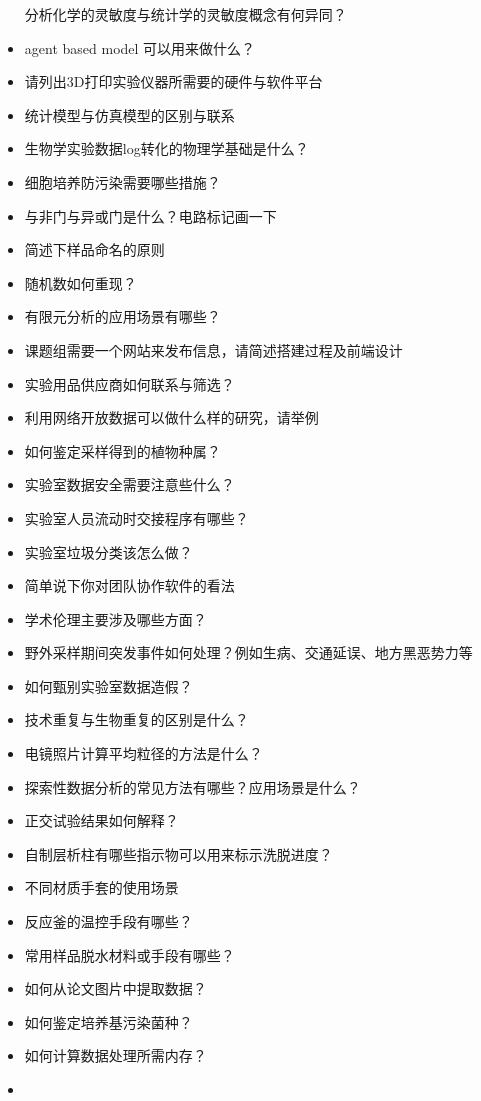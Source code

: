 \documentclass[]{tufte-book}
\begin{document}
\begin{itemize}
  分析化学的灵敏度与统计学的灵敏度概念有何异同？
\item
  agent based model 可以用来做什么？
\item
  请列出3D打印实验仪器所需要的硬件与软件平台
\item
  统计模型与仿真模型的区别与联系
\item
  生物学实验数据log转化的物理学基础是什么？
\item
  细胞培养防污染需要哪些措施？
\item
  与非门与异或门是什么？电路标记画一下
\item
  简述下样品命名的原则
\item
  随机数如何重现？
\item
  有限元分析的应用场景有哪些？
\item
  课题组需要一个网站来发布信息，请简述搭建过程及前端设计
\item
  实验用品供应商如何联系与筛选？
\item
  利用网络开放数据可以做什么样的研究，请举例
\item
  如何鉴定采样得到的植物种属？
\item
  实验室数据安全需要注意些什么？
\item
  实验室人员流动时交接程序有哪些？
\item
  实验室垃圾分类该怎么做？
\item
  简单说下你对团队协作软件的看法
\item
  学术伦理主要涉及哪些方面？
\item
  野外采样期间突发事件如何处理？例如生病、交通延误、地方黑恶势力等
\item
  如何甄别实验室数据造假？
\item
  技术重复与生物重复的区别是什么？
\item
  电镜照片计算平均粒径的方法是什么？
\item
  探索性数据分析的常见方法有哪些？应用场景是什么？
\item
  正交试验结果如何解释？
\item
  自制层析柱有哪些指示物可以用来标示洗脱进度？
\item
  不同材质手套的使用场景
\item
  反应釜的温控手段有哪些？
\item
  常用样品脱水材料或手段有哪些？
\item
  如何从论文图片中提取数据？
\item
  如何鉴定培养基污染菌种？
\item
  如何计算数据处理所需内存？
\item

\end{itemize}
\end{document}
